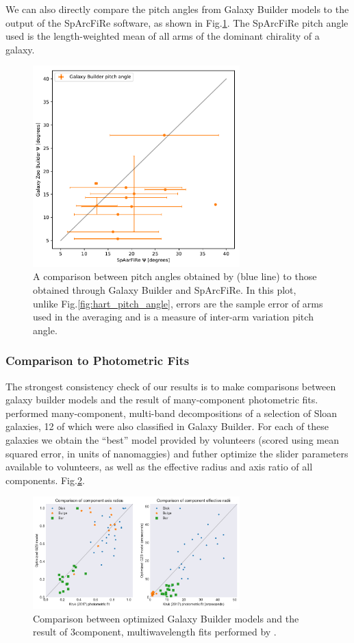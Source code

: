 \documentclass[../main.tex]{subfiles}
\begin{document}
We can also directly compare the pitch angles from Galaxy Builder models to the output of the SpArcFiRe software, as shown in Fig.\ref{fig:sparcfire_pitch_angle}. The SpArcFiRe pitch angle used is the length-weighted mean of all arms of the dominant chirality of a galaxy.
\begin{figure}
  \includegraphics[width=8cm]{images__results/pitch-angle-comparison2.pdf}
  \caption{A comparison between pitch angles obtained by \citet{Hart2016:1607.01019v1} (blue line) to those obtained through Galaxy Builder and SpArcFiRe. In this plot, unlike Fig.\ref{fig:hart_pitch_angle}, errors are the sample error of arms used in the averaging and is a measure of inter-arm variation pitch angle.}
  \label{fig:sparcfire_pitch_angle}
\end{figure}


\subsubsection{Comparison to Photometric Fits}
The strongest consistency check of our results is to make comparisons between galaxy builder models and the result of many-component photometric fits. \citet{Kruk2017:1710.00093v2} performed many-component, multi-band decompositions of a selection of Sloan galaxies, 12 of which were also classified in Galaxy Builder. For each of these galaxies we obtain the ``best'' model provided by volunteers (scored using mean squared error, in units of nanomaggies) and futher optimize the slider parameters available to volunteers, as well as the effective radius and axis ratio of all components. Fig.\ref{fig:sd_comp_comparison}.

\begin{figure}
  \includegraphics[width=8cm]{images__results/sd_comp_comparison.pdf}
  \caption{Comparison between optimized Galaxy Builder models and the result of 3\-component, multi\-wavelength fits performed by \citet{Kruk2017:1710.00093v2}.}
  \label{fig:sd_comp_comparison}
\end{figure}
\end{document}
